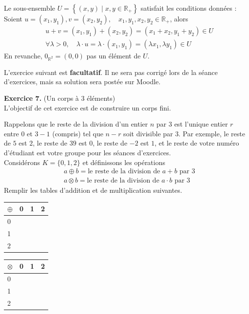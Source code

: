 \documentclass[a4paper, 10pt]{report}
\begin{document}
\begin{enumerate}[label=\arabic*.]
		\colorbox{solution}
		{
			\begin{minipage}{0.9\textwidth}
				Le sous-ensemble $U = \left\{(x, y) \mid 
					x, y \in \mathbb{R}_+ \right\}$ satisfait les
				conditions données :\\
					Soient $u = (x_1, y_1), v = (x_2, y_2),
				\quad x_1, y_1, x_2, y_2 \in \mathbb{R}_+$, alors
				\[\begin{split}
					&u + v = (x_1, y_1) + (x_2, y_2)
						= (x_1 + x_2, y_1 + y_2) \in U\\
					&\forall \lambda > 0, \quad \lambda \cdot u
						= \lambda \cdot (x_1, y_1)
						= (\lambda x_1, \lambda y_1) \in U
				\end{split}\]
				En revanche, $0_{\mathbb{R}^2} = (0, 0)$ pas un
				élément de $U$.
			\end{minipage}
		}
	\end{enumerate}
		
	\newpage
	
	\noindent
	L'exercice suivant est \textbf{facultatif}. Il ne sera pas
	corrigé lors de la séance d'exercices, mais sa solution sera
	postée sur Moodle.
	
	\vspace{10mm}
	\noindent
	\textbf{Exercice 7.} (Un corps à 3 éléments)\\
	L’objectif de cet exercice est de construire un corps fini.
	
	\noindent
	Rappelons que le reste de la division d’un entier $n$ par $3$
	est l’unique entier $r$ entre $0$ et $3 - 1$ (compris) tel
	que $n - r$ soit divisible par $3$. Par exemple, le reste de
	$5$ est $2$, le reste de $39$ est $0$, le reste de $-2$ est $1$,
	et le reste de votre numéro d’étudiant est votre groupe pour
	les séances d’exercices.\\
	
	\noindent
	Considérons $K = \{0, 1, 2\}$ et définissons les opérations
	\[
	\begin{split}
		&a \oplus b = \text{le reste de la division de }
			a + b \text{ par } 3\\
		&a \otimes b = \text{le reste de la division de }
			a \cdot b \text{ par } 3
	\end{split}
	\]
	Remplir les tables d'addition et de multiplication suivantes.
	
	\begin{center}
	\begin{tabular}{l|l|l|l|}
		$\oplus$ & 0 & 1 & 2 \\
		\hline
		0 & & & \\
		\hline
		1 & & & \\
		\hline
		2 & & & \\
		\hline
	\end{tabular}
	\qquad
	\begin{tabular}{l|l|l|l|}
		$\otimes$ & 0 & 1 & 2 \\
		\hline
		0 & & & \\
		\hline
		1 & & & \\
		\hline
		2 & & & \\
		\hline
	\end{tabular}
	\end{center}
	
\end{document}
